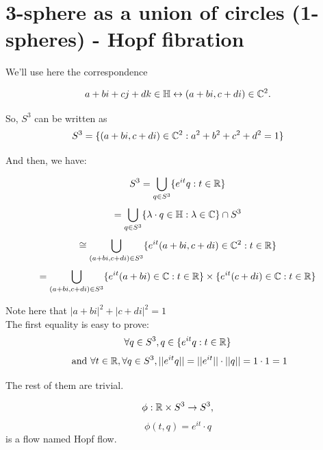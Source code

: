 \section{3-sphere as a union of circles (1-spheres) - Hopf fibration} %

We'll use here the correspondence 

\begin{equation*}
    a+bi+cj+dk \in \mathbb{H} \leftrightarrow (a+bi, c+di) \in \mathbb{C}^2.
\end{equation*}

So, $S^3$ can be written as 
\begin{equation*}
    S^3 = \{(a+bi, c+di) \in \mathbb{C}^2 : a^2+b^2+c^2+d^2=1\}
\end{equation*}

And then, we have:

\begin{equation*}
S^3 = \bigcup\limits_{q \in S^3} \{ e^{it}q : t \in \mathbb{R} \}
\end{equation*}
\begin{equation*}
= \bigcup\limits_{q \in S^3} \{ \lambda \cdot q \in \mathbb{H} : \lambda \in \mathbb{C} \} \cap S^3
\end{equation*}
\begin{equation*}
\cong \bigcup\limits_{(a+bi, c+di) \in S^3} \{ e^{it}(a+bi, c+di) \in \mathbb{C}^2 : t \in \mathbb{R} \}
\end{equation*}
\begin{equation}\label{direccoord}
     = \bigcup\limits_{(a+bi, c+di) \in S^3} \{ e^{it}(a+bi) \in \mathbb{C} : t \in \mathbb{R} \} \times \{ e^{it}(c+di) \in \mathbb{C}: t \in \mathbb{R} \}
\end{equation}

Note here that $|a+bi|^2 + |c+di|^2 = 1$
\\

The first equality is easy to prove:
\begin{equation*}
    \forall q \in S^3, q \in \{ e^{it}q : t \in \mathbb{R} \} 
\end{equation*}
\begin{equation*}
    \mbox{ and   } \forall t \in \mathbb{R}, \forall q \in S^3, ||e^{it}q||=||e^{it}|| \cdot ||q||=1\cdot1=1
\end{equation*}

The rest of them are trivial.

\begin{equation*}
\phi : \mathbb{R} \times S^3 \rightarrow S^3,
\end{equation*}
\begin{equation*}
\phi(t, q) = e^{it} \cdot q    
\end{equation*}
is a flow named Hopf flow. %

